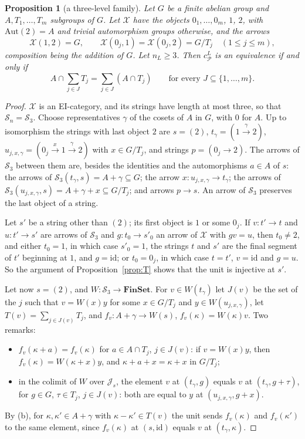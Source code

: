 \documentclass[11pt]{amsart}
\newtheorem{prop}[thm]{Proposition}
\theoremstyle{definition}
\newcommand{\Fin}{\mathbf{FinSet}}
\newcommand{\Aut}{\mathrm{Aut}}
\newcommand{\cX}{\mathcal X}
\newcommand{\cP}{\mathcal P}
\newcommand{\cS}{\mathcal S}
\newcommand{\cJ}{\mathcal J}
\newcommand{\id}{\mathrm{id}}
\begin{document}
\begin{prop}[a three-level family]\label{prop:dist}
Let $G$ be a finite abelian group and $A,T_1,\dots,T_m$ subgroups of
$G$. Let $\cX$ have the objects $0_1,\dots,0_m$, $1$, $2$, with
$\Aut(2)=A$ and trivial automorphism groups otherwise, and the arrows
\[
\cX(1,2)=G,\qquad\cX(0_j,1)=\cX(0_j,2)=G/T_j\quad(1\le j\le m),
\]
composition being the addition of $G$. Let $n_L\ge3$. Then $c^L_\cP$
is an equivalence if and only if
\begin{equation}\label{eq:dist}
A\cap\sum_{j\in J}T_j=\sum_{j\in J}(A\cap T_j)\qquad\text{for every }
J\subseteq\{1,\dots,m\}.
\end{equation}
\end{prop}
\begin{proof}
$\cX$ is an EI-category, and its strings have length at most three, so
that $\cS_n=\cS_3$. Choose representatives $\gamma$ of the cosets of
$A$ in $G$, with $0$ for $A$. Up to isomorphism the strings with last object $2$ are
$s=(2)$, $t_\gamma=(1\xrightarrow{\gamma}2)$, $u_{j,x,\gamma}=(0_j
\xrightarrow{x}1\xrightarrow{\gamma}2)$ with $x\in G/T_j$, and strings
$p=(0_j\to2)$. The arrows of $\cS_3$ between them are, besides the
identities and the automorphisms $a\in A$ of $s$: the arrows of $\cS_3
(t_\gamma,s)=A+\gamma\subseteq G$; the arrow $x\colon u_{j,x,\gamma}\to
t_\gamma$; the arrows of $\cS_3(u_{j,x,\gamma},s)=A+\gamma+x\subseteq
G/T_j$; and arrows $p\to s$. An arrow of $\cS_3$ preserves the last
object of a string.

Let $s'$ be a string other than $(2)$; its first object is $1$ or some
$0_j$. If $v\colon t'\to t$ and $u\colon t'\to s'$ are arrows of
$\cS_3$ and $g\colon t_0\to s'_0$ an arrow of $\cX$ with $gv=u$, then
$t_0\ne2$, and either $t_0=1$, in which case $s'_0=1$, the strings
$t$ and $s'$ are the final segment of $t'$ beginning at $1$, and
$g=\id$; or $t_0=0_j$, in which case $t=t'$, $v=\id$ and $g=u$. So the argument of
Proposition~\ref{prop:T} shows that the unit is injective at $s'$.

Let now $s=(2)$, and $W\colon\cS_3\to\Fin$. For $v\in W(t_\gamma)$ let
$J(v)$ be the set of the $j$ such that $v=W(x)y$ for some $x\in G/T_j$
and $y\in W(u_{j,x,\gamma})$, let $T(v)=\sum_{j\in J(v)}T_j$, and
$f_v\colon A+\gamma\to W(s)$, $f_v(\kappa)=W(\kappa)v$. Two remarks:
\begin{itemize}
\item[(a)] $f_v(\kappa+a)=f_v(\kappa)$ for $a\in A\cap T_j$, $j\in
J(v)$: if $v=W(x)y$, then $f_v(\kappa)=W(\kappa+x)y$, and $\kappa+a+x=
\kappa+x$ in $G/T_j$;
\item[(b)] in the colimit of $W$ over $\cJ_s$, the element $v$ at
$(t_\gamma,g)$ equals $v$ at $(t_\gamma,g+\tau)$, for $g\in G$, $\tau
\in T_j$, $j\in J(v)$: both are equal to $y$ at $(u_{j,x,\gamma},g+x)$.
\end{itemize}
By (b), for $\kappa,\kappa'\in A+\gamma$ with $\kappa-\kappa'\in T(v)$
the unit sends $f_v(\kappa)$ and $f_v(\kappa')$ to the same element,
since $f_v(\kappa)$ at $(s,\id)$ equals $v$ at $(t_\gamma,\kappa)$.


\end{proof}
\end{document}
